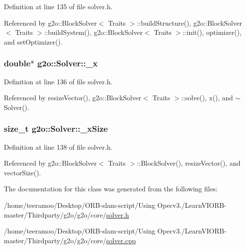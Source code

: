 Definition at line 135 of file solver.\+h.



Referenced by g2o\+::\+Block\+Solver$<$ Traits $>$\+::build\+Structure(), g2o\+::\+Block\+Solver$<$ Traits $>$\+::build\+System(), g2o\+::\+Block\+Solver$<$ Traits $>$\+::init(), optimizer(), and set\+Optimizer().

\subsubsection[{\texorpdfstring{\+\_\+x}{_x}}]{\setlength{\rightskip}{0pt plus 5cm}double$\ast$ g2o\+::\+Solver\+::\+\_\+x\hspace{0.3cm}{\ttfamily [protected]}}\hypertarget{classg2o_1_1Solver_a94ee5e303a754f4ff338a7b032c214ae}{}\label{classg2o_1_1Solver_a94ee5e303a754f4ff338a7b032c214ae}


Definition at line 136 of file solver.\+h.



Referenced by resize\+Vector(), g2o\+::\+Block\+Solver$<$ Traits $>$\+::solve(), x(), and $\sim$\+Solver().

\subsubsection[{\texorpdfstring{\+\_\+x\+Size}{_xSize}}]{\setlength{\rightskip}{0pt plus 5cm}size\+\_\+t g2o\+::\+Solver\+::\+\_\+x\+Size\hspace{0.3cm}{\ttfamily [protected]}}\hypertarget{classg2o_1_1Solver_abcf7731347f14915bd9ba963021ea830}{}\label{classg2o_1_1Solver_abcf7731347f14915bd9ba963021ea830}


Definition at line 138 of file solver.\+h.



Referenced by g2o\+::\+Block\+Solver$<$ Traits $>$\+::\+Block\+Solver(), resize\+Vector(), and vector\+Size().



The documentation for this class was generated from the following files\+:\begin{DoxyCompactItemize}
\item 
/home/teeramoo/\+Desktop/\+O\+R\+B-\/slam-\/script/\+Using Opecv3./\+Learn\+V\+I\+O\+R\+B-\/master/\+Thirdparty/g2o/g2o/core/\hyperlink{solver_8h}{solver.\+h}\item 
/home/teeramoo/\+Desktop/\+O\+R\+B-\/slam-\/script/\+Using Opecv3./\+Learn\+V\+I\+O\+R\+B-\/master/\+Thirdparty/g2o/g2o/core/\hyperlink{solver_8cpp}{solver.\+cpp}\end{DoxyCompactItemize}
